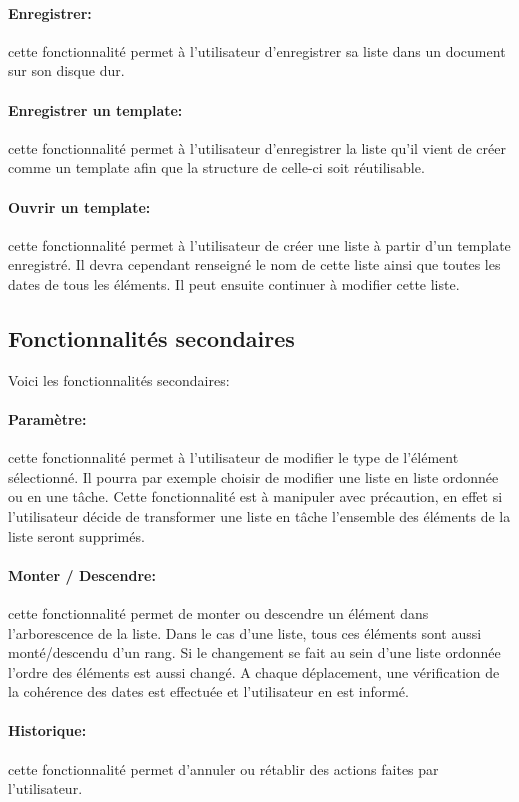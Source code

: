 \documentclass[a4paper,10pt]{article}
\begin{document}
\paragraph{Enregistrer:} cette fonctionnalité permet à l'utilisateur d'enregistrer sa liste dans un document sur son disque dur.
\paragraph{Enregistrer un template:} cette fonctionnalité permet à l'utilisateur d'enregistrer la liste qu'il vient de créer comme un template afin que la structure de celle-ci soit réutilisable.
\paragraph{Ouvrir un template:} cette fonctionnalité permet à l'utilisateur de créer une liste à partir d'un template enregistré. Il devra cependant renseigné le nom de cette liste ainsi que toutes les dates de tous les éléments. Il peut ensuite continuer à modifier cette liste.

\subsection{Fonctionnalités secondaires}
Voici les fonctionnalités secondaires:
\paragraph{Paramètre:} cette fonctionnalité permet à l'utilisateur de modifier le type de l'élément sélectionné. Il pourra par exemple choisir de modifier une liste en liste ordonnée ou en une tâche. Cette fonctionnalité est à manipuler avec précaution, en effet si l'utilisateur décide de transformer une liste en tâche l'ensemble des éléments de la liste seront supprimés.
\paragraph{Monter / Descendre:} cette fonctionnalité permet de monter ou descendre un élément dans l'arborescence de la liste. Dans le cas d'une liste, tous ces éléments sont aussi monté/descendu d'un rang. Si le changement se fait au sein d'une liste ordonnée l'ordre des éléments est aussi changé. A chaque déplacement, une vérification de la cohérence des dates est effectuée et l'utilisateur en est informé.
\paragraph{Historique:} cette fonctionnalité permet d'annuler ou rétablir des actions faites par l'utilisateur.
\end{document}
